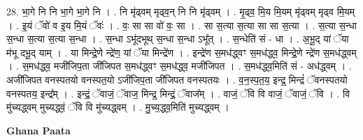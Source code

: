 \documentclass[17pt]{extarticle}
\begin{document}
28. भा॒गे नि नि भा॒गे भा॒गे नि । . नि मृ॑ढ्वम् मृढ्व॒न् नि नि मृ॑ढ्वम् । . मृ॒ढ्व॒ मि॒य मि॒यम् मृ॑ढ्वम् मृढ्व मि॒यम् । . इ॒यं ॅवो॑ व इ॒य मि॒यं ॅवः॑ । . वः॒ सा सा वो॑ वः॒ सा । . सा स॒त्या स॒त्या सा सा स॒त्या । . स॒त्या स॒न्धा स॒न्धा स॒त्या स॒त्या स॒न्धा । . स॒न्धा ऽभू॑दभूथ् स॒न्धा स॒न्धा ऽभू᳚त् । . स॒न्धेति॑ सं - धा । . अ॒भू॒द् यां ॅया म॑भू दभू॒द् याम् । . या मिन्द्रे॒णे न्द्रे॑ण॒ यां ॅया मिन्द्रे॑ण । . इन्द्रे॑ण स॒मध॑द्ध्वꣳ स॒मध॑द्ध्व॒ मिन्द्रे॒णे न्द्रे॑ण स॒मध॑द्ध्वम् । . स॒मध॑द्ध्व॒ मजी॑जिप॒ता जी॑जिपत स॒मध॑द्ध्वꣳ स॒मध॑द्ध्व॒ मजी॑जिपत । . स॒मध॑द्ध्व॒मिति॑ सं - अध॑द्ध्वम् । . अजी॑जिपत वनस्पतयो वनस्पत॒यो ऽजी॑जिप॒ता जी॑जिपत वनस्पतयः । . व॒न॒स्प॒त॒य॒ इन्द्र॒ मिन्द्रं॑ ॅवनस्पतयो वनस्पतय॒ इन्द्र᳚म् । . इन्द्रं॒ ॅवाजं॒ ॅवाज॒ मिन्द्र॒ मिन्द्रं॒ ॅवाज᳚म् । . वाजं॒ ॅवि वि वाजं॒ ॅवाजं॒ ॅवि । . वि मु॑च्यद्ध्वम् मुच्यद्ध्वं॒ ॅवि वि मु॑च्यद्ध्वम् । . मु॒च्य॒द्ध्व॒मिति॑ मुच्यद्ध्वम् । \newline

\textbf{Ghana Paata } \newline
\end{document}
